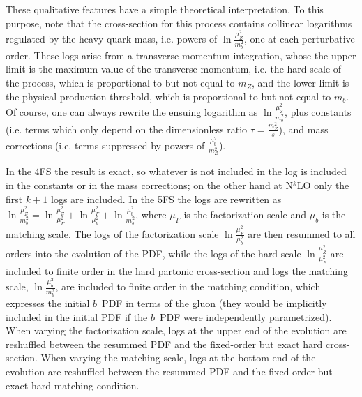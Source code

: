 \documentclass[12pt]{article}
\begin{document}
These qualitative features have a simple theoretical
interpretation. To this purpose, note that the cross-section for
this process contains collinear logarithms regulated by the heavy
quark mass, i.e. powers of $\ln\frac{\mu_Z^2}{m_b^2}$, one at each
perturbative order. These logs  
arise from a transverse
momentum integration, whose the upper limit is the maximum value of the
transverse momentum, i.e. the hard scale of the process, 
which is proportional to but not equal to $m_Z$, and the lower limit
is the physical production threshold, which is proportional to but not
equal to $m_b$. Of course, one can always rewrite the ensuing
logarithm as  $\ln\frac{\mu_Z^2}{m_b^2}$, plus constants (i.e. terms
which only depend on the dimensionless ratio $\tau=\frac{m_Z^2}{s}$),
and mass corrections (i.e. terms suppressed by powers of
$\frac{\mu^2_b}{m_Z^2}$). 

In the 4FS the result is exact, so whatever is not included in the log is included in
the constants or in the mass corrections; on the other hand at
N$^{k}$LO only the first $k+1$ logs are included. In the 5FS the logs are
rewritten as
$\ln\frac{\mu_Z^2}{m_b^2}=\ln\frac{\mu_Z^2}{\mu_F^2}+\ln\frac{\mu_F^2}{\mu_b^2}+\ln\frac{\mu_b^2}{m_b^2}
$, where $\mu_F$ is the factorization  scale and 
$\mu_b$ is the matching scale. The logs of the factorization scale 
$\ln\frac{\mu_F^2}{\mu_b^2}$ are then resummed to all orders into
the evolution of the PDF, while
the logs of the hard scale $\ln\frac{\mu_Z^2}{\mu_F^2}$ are included to
finite order in the hard partonic cross-section and
logs the matching scale, $\ln\frac{\mu_b^2}{m_b^2}$, are 
included to finite order in the matching condition, which
expresses the initial $b$~PDF in terms of the gluon (they would be 
implicitly included in the initial PDF
if the $b$~PDF were independently parametrized).
When varying the factorization scale, logs at the upper end
of the evolution are reshuffled between the resummed PDF and the
fixed-order but exact hard cross-section. When varying the matching
scale, logs at the bottom end 
of the evolution are reshuffled between the resummed PDF and the
fixed-order but exact hard matching condition.
\end{document}
